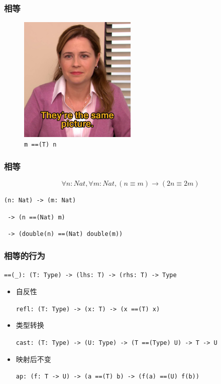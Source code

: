 \documentclass[UTF-8]{ctexbeamer}
\begin{document}
\begin{frame}
  \frametitle{相等}

  \pause
  \begin{figure}
    \includegraphics[width=0.5\textwidth]{assets/same.png}
    \caption{\texttt{m ==(T) n}}
  \end{figure}
\end{frame}

\begin{frame}
  \frametitle{相等}

  $$
  \forall n: Nat, \forall m: Nat, (n \equiv m) \rightarrow (2n \equiv 2m)
  $$

  \pause

  \texttt{(n: Nat) -> (m: Nat)}

  \texttt{    -> (n ==(Nat) m)}

  \texttt{    -> (double(n) ==(Nat) double(m))}
\end{frame}

\begin{frame}
  \frametitle{相等的行为}

  \begin{center}
    \texttt{==(\_): (T: Type) -> (lhs: T) -> (rhs: T) -> Type}
  \end{center}

  \pause
  \begin{itemize}
    \item 自反性
    
    \texttt{refl: (T: Type) -> (x: T) -> (x ==(T) x)}

    \pause
    \item 类型转换
    
    \texttt{cast: (T: Type) -> (U: Type) -> (T ==(Type) U) -> T -> U}

    \pause
    \item 映射后不变
    
    \texttt{ap: (f: T -> U) -> (a ==(T) b) -> (f(a) ==(U) f(b))}
  \end{itemize}
\end{frame}
\end{document}
